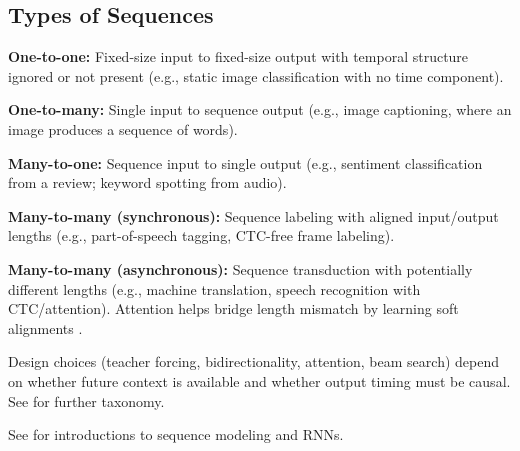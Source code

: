 
\subsection{Types of Sequences}

\textbf{One-to-one:} Fixed-size input to fixed-size output with temporal structure ignored or not present (e.g., static image classification with no time component).

\textbf{One-to-many:} Single input to sequence output (e.g., image captioning, where an image produces a sequence of words).

\textbf{Many-to-one:} Sequence input to single output (e.g., sentiment classification from a review; keyword spotting from audio).

\textbf{Many-to-many (synchronous):} Sequence labeling with aligned input/output lengths (e.g., part-of-speech tagging, CTC-free frame labeling).

\textbf{Many-to-many (asynchronous):} Sequence transduction with potentially different lengths (e.g., machine translation, speech recognition with CTC/attention). Attention helps bridge length mismatch by learning soft alignments \cite{Bahdanau2014}.

Design choices (teacher forcing, bidirectionality, attention, beam search) depend on whether future context is available and whether output timing must be causal. See \cite{D2LChapterRNN,WebRNNWikipedia} for further taxonomy.


See \cite{GoodfellowEtAl2016,Prince2023,Bishop2006,WebRNNWikipedia,WebDLBRNN,D2LChapterRNN} for introductions to sequence modeling and RNNs.

